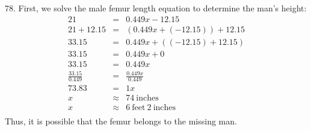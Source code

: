 \documentclass[letterpaper]{article}
\begin{document}
\bigskip

78. First, we solve the male femur length equation to determine the man's
height:
\begin{eqnarray*}
21 &=& 0.449x-12.15 \\
21+12.15 &=& (0.449x+(-12.15))+12.15 \\
33.15 &=& 0.449x+((-12.15)+12.15) \\
33.15 &=& 0.449x+0 \\
33.15 &=& 0.449x \\
\frac{33.15}{0.449} &=& \frac{0.449x}{0.449} \\
73.83 &=& 1x \\
x &\approx& 74\ \mbox{inches} \\
x &\approx& 6\ \mbox{feet}\ 2\ \mbox{inches} \\
\end{eqnarray*}
Thus, it is possible that the femur belongs to the missing man.
\end{document}
